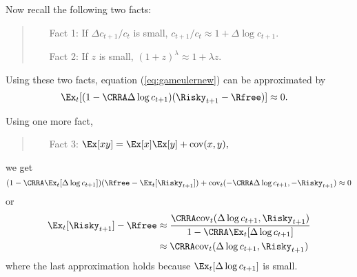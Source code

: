 \documentclass{\econtex}
\begin{document}
\noindent Now recall the following two facts:

\begin{quote}
  \begin{itemize}

  \item[Fact 1: ] If $\Delta c_{t+1}/c_{t}$ is small, $c_{t+1}/c_{t} \approx 1+ \Delta \log c_{t+1}.$

  \item[Fact 2: ] If $z$ is small, $(1+z)^{\lambda} \approx 1 + \lambda z$.

  \end{itemize}
\end{quote}

\noindent Using these two facts, equation (\ref{eq:gameulernew}) can be approximated by
\begin{equation}\begin{gathered}\begin{aligned}
      \Ex_{t}[(1-\CRRA \Delta \log {c}_{t+1})(\Risky_{t+1}-\Rfree)] & \approx  0.
    \end{aligned}\end{gathered}\end{equation}

\noindent Using one more fact,
\begin{quote}
  \begin{itemize}
  \item[Fact 3:] $\Ex [xy] = \Ex [x]\Ex [y] + \text{cov}(x,y),$
  \end{itemize}
\end{quote}
we get
\begin{equation}
  (1-\CRRA \Ex_{t}[\Delta \log {c}_{t+1}])(\Rfree - \Ex_{t}[\Risky_{t+1}])+\text{cov}_{t}(-\CRRA \Delta \log {c}_{t+1},-\Risky_{t+1})  \approx  0  
\end{equation}
or
\begin{equation}\begin{gathered}\begin{aligned}
      \Ex_{t}[\Risky_{t+1}]-\Rfree & \approx  \frac{\CRRA \text{cov}_{t}(\Delta \log {c}_{t+1},\Risky_{t+1})}{1-\CRRA \Ex_{t}[ \Delta \log {c}_{t+1}]} 
      \\                             & \approx  \CRRA \text{cov}_{t}(\Delta \log {c}_{t+1},\Risky_{t+1}) \label{eq:eqprem}
    \end{aligned}\end{gathered}\end{equation}
\noindent where the last approximation holds because $\Ex_{t}[\Delta 
\log {c}_{t+1}]$ is small.  
\end{document}
